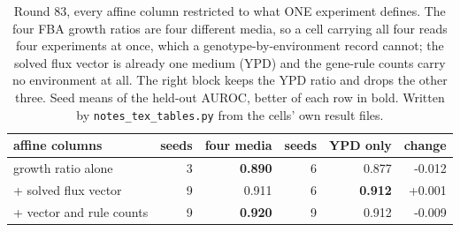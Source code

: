 \begin{table}[H]
  \centering
  \footnotesize
  \caption[Round 83: the single-experiment ablation]{Round 83, every affine column restricted to what ONE experiment defines. The four FBA growth ratios are four different media, so a cell carrying all four reads four experiments at once, which a genotype-by-environment record cannot; the solved flux vector is already one medium (YPD) and the gene-rule counts carry no environment at all. The right block keeps the YPD ratio and drops the other three. Seed means of the held-out AUROC, better of each row in bold. Written by \texttt{notes\_tex\_tables.py} from the cells' own result files.}
  \label{tab:single-experiment}
  \begin{tabular}{@{}lrrrrr@{}}
    \hline
    affine columns & seeds & four media & seeds & YPD only & change \\
    \hline
    growth ratio alone & 3 & \textbf{0.890} & 6 & 0.877 & -0.012 \\
    + solved flux vector & 9 & 0.911 & 6 & \textbf{0.912} & +0.001 \\
    + vector and rule counts & 9 & \textbf{0.920} & 9 & 0.912 & -0.009 \\
    \hline
  \end{tabular}
\end{table}
